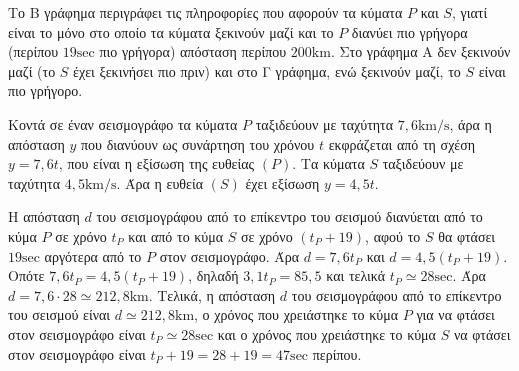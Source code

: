 
\begin{alist}
\item Το Β γράφημα περιγράφει τις πληροφορίες που αφορούν τα κύματα $P$ και $S$, γιατί είναι το μόνο στο οποίο τα κύματα ξεκινούν μαζί και το $P$ διανύει πιο γρήγορα (περίπου $19\text{sec}$ πιο γρήγορα) απόσταση περίπου $200\text{km}$.
Στο γράφημα Α δεν ξεκινούν μαζί (το $S$ έχει ξεκινήσει πιο πριν) και στο Γ γράφημα, ενώ ξεκινούν μαζί, το $S$ είναι πιο γρήγορο.

\item
\begin{rlist}
\item Κοντά σε έναν σεισμογράφο τα κύματα $P$ ταξιδεύουν με ταχύτητα $7,6 \text{km/s}$, άρα η απόσταση $y$ που διανύουν ως συνάρτηση του χρόνου $t$ εκφράζεται από τη σχέση $y = 7,6t$, που είναι η εξίσωση της ευθείας $(P)$.
Τα κύματα $S$ ταξιδεύουν με ταχύτητα $4,5 \text{km/s}$. Άρα η ευθεία $(S)$ έχει εξίσωση $y = 4,5t$.

\item Η απόσταση $d$ του σεισμογράφου από το επίκεντρο του σεισμού διανύεται από το κύμα $P$ σε χρόνο $t_P$ και από το κύμα $S$ σε χρόνο $(t_P + 19)$, αφού το $S$ θα φτάσει $19\text{sec}$ αργότερα από το $P$ στον σεισμογράφο. Άρα $d = 7,6t_P$ και $d = 4,5(t_P + 19)$.
Οπότε $7,6t_P = 4,5(t_P + 19)$, δηλαδή $3,1t_P = 85,5$ και τελικά $t_P \simeq 28\text{sec}$.
Άρα $d = 7,6 \cdot 28 \simeq 212,8\text{km}$.
Τελικά, η απόσταση $d$ του σεισμογράφου από το επίκεντρο του σεισμού είναι $d \simeq 212,8\text{km}$, ο χρόνος που χρειάστηκε το κύμα $P$ για να φτάσει στον σεισμογράφο είναι $t_P \simeq 28\text{sec}$ και ο χρόνος που χρειάστηκε το κύμα $S$ να φτάσει στον σεισμογράφο είναι $t_P + 19 = 28 + 19 = 47\text{sec}$ περίπου.
\end{rlist}
\end{alist}

